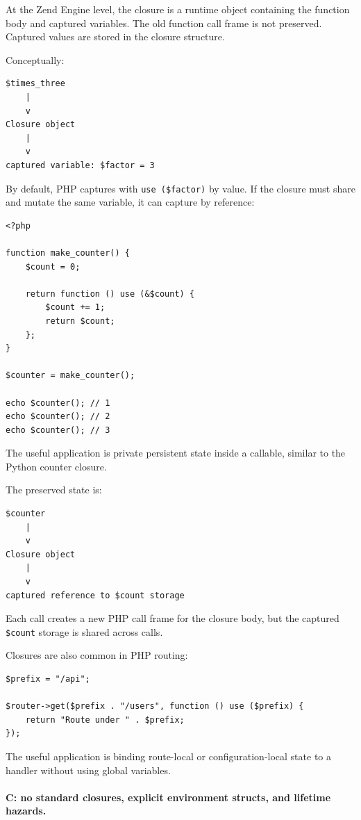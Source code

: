 At the Zend Engine level, the closure is a runtime object containing the function body and captured variables. The old function call frame is not preserved. Captured values are stored in the closure structure.

Conceptually:

\begin{verbatim}
$times_three
    |
    v
Closure object
    |
    v
captured variable: $factor = 3
\end{verbatim}

By default, PHP captures with \texttt{use (\$factor)} by value. If the closure must share and mutate the same variable, it can capture by reference:

\begin{verbatim}
<?php

function make_counter() {
    $count = 0;

    return function () use (&$count) {
        $count += 1;
        return $count;
    };
}

$counter = make_counter();

echo $counter(); // 1
echo $counter(); // 2
echo $counter(); // 3
\end{verbatim}

The useful application is private persistent state inside a callable, similar to the Python counter closure.

The preserved state is:

\begin{verbatim}
$counter
    |
    v
Closure object
    |
    v
captured reference to $count storage
\end{verbatim}

Each call creates a new PHP call frame for the closure body, but the captured \texttt{\$count} storage is shared across calls.

Closures are also common in PHP routing:

\begin{verbatim}
$prefix = "/api";

$router->get($prefix . "/users", function () use ($prefix) {
    return "Route under " . $prefix;
});
\end{verbatim}

The useful application is binding route-local or configuration-local state to a handler without using global variables.

\paragraph{C: no standard closures, explicit environment structs, and lifetime hazards.}

